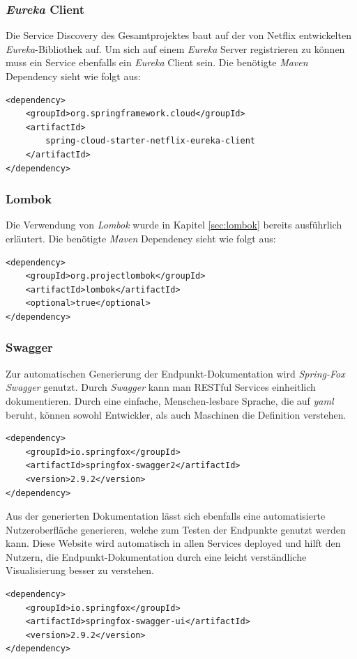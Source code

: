 \subsubsection*{\textit{Eureka} Client}
Die Service Discovery des Gesamtprojektes baut auf der von Netflix entwickelten \textit{Eureka}-Bibliothek auf. Um sich auf einem \textit{Eureka} Server registrieren zu können muss ein Service ebenfalls ein \textit{Eureka} Client sein. Die benötigte \textit{Maven} Dependency sieht wie folgt aus:
\begin{lstlisting}[caption={\textit{Eureka} Service Discovery Client Dependency}]
<dependency>
    <groupId>org.springframework.cloud</groupId>
    <artifactId>
        spring-cloud-starter-netflix-eureka-client
    </artifactId>
</dependency>
\end{lstlisting}

\newpage
\subsubsection*{Lombok}
Die Verwendung von \textit{Lombok} wurde in Kapitel \ref{sec:lombok} bereits ausführlich erläutert. Die benötigte \textit{Maven} Dependency sieht wie folgt aus:
\begin{lstlisting}[caption={Lombok Dependency}]
<dependency>
    <groupId>org.projectlombok</groupId>
    <artifactId>lombok</artifactId>
    <optional>true</optional>
</dependency>
\end{lstlisting}

\subsubsection*{Swagger}
Zur automatischen Generierung der Endpunkt-Dokumentation wird \textit{Spring-Fox Swagger} genutzt. Durch \textit{Swagger} kann man \ac{REST}ful Services einheitlich dokumentieren. Durch eine einfache, Menschen-lesbare Sprache, die auf \textit{yaml} beruht, können sowohl Entwickler, als auch Maschinen die Definition verstehen.
\begin{lstlisting}[caption={\textit{Swagger} Dependency}]
<dependency>
    <groupId>io.springfox</groupId>
    <artifactId>springfox-swagger2</artifactId>
    <version>2.9.2</version>
</dependency>
\end{lstlisting}
Aus der generierten Dokumentation lässt sich ebenfalls eine automatisierte Nutzeroberfläche generieren, welche zum Testen der Endpunkte genutzt werden kann. Diese Website wird automatisch in allen Services deployed und hilft den Nutzern, die Endpunkt-Dokumentation durch eine leicht verständliche Visualisierung besser zu verstehen.
\begin{lstlisting}[caption={\textit{Swagger-UI} Dependency}]
<dependency>
    <groupId>io.springfox</groupId>
    <artifactId>springfox-swagger-ui</artifactId>
    <version>2.9.2</version>
</dependency>
\end{lstlisting}

